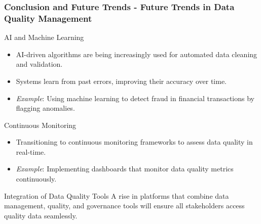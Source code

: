 \documentclass[aspectratio=169]{beamer}
\begin{document}
\begin{frame}[fragile]
    \frametitle{Conclusion and Future Trends - Future Trends in Data Quality Management}
    
    \begin{block}{AI and Machine Learning}
        \begin{itemize}
            \item AI-driven algorithms are being increasingly used for automated data cleaning and validation.
            \item Systems learn from past errors, improving their accuracy over time.
            \item \textit{Example}: Using machine learning to detect fraud in financial transactions by flagging anomalies.
        \end{itemize}
    \end{block}

    \begin{block}{Continuous Monitoring}
        \begin{itemize}
            \item Transitioning to continuous monitoring frameworks to assess data quality in real-time.
            \item \textit{Example}: Implementing dashboards that monitor data quality metrics continuously.
        \end{itemize}
    \end{block}
    
    \begin{block}{Integration of Data Quality Tools}
        A rise in platforms that combine data management, quality, and governance tools will ensure all stakeholders access quality data seamlessly.
    \end{block}
\end{frame}
\end{document}
